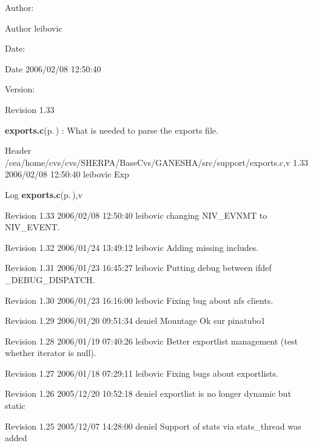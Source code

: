 \begin{Desc}
\item[Author:]\begin{Desc}
\item[Author]leibovic \end{Desc}
\end{Desc}
\begin{Desc}
\item[Date:]\begin{Desc}
\item[Date]2006/02/08 12:50:40 \end{Desc}
\end{Desc}
\begin{Desc}
\item[Version:]\begin{Desc}
\item[Revision]1.33 \end{Desc}
\end{Desc}
{\bf exports.c}{\rm (p.\,\pageref{exports_8c})} : What is needed to parse the exports file.

\begin{Desc}
\item[Header]/cea/home/cvs/cvs/SHERPA/Base\-Cvs/GANESHA/src/support/exports.c,v 1.33 2006/02/08 12:50:40 leibovic Exp \end{Desc}


\begin{Desc}
\item[Log]{\bf exports.c}{\rm (p.\,\pageref{exports_8c})},v \end{Desc}
Revision 1.33 2006/02/08 12:50:40 leibovic changing NIV\_\-EVNMT to NIV\_\-EVENT.

Revision 1.32 2006/01/24 13:49:12 leibovic Adding missing includes.

Revision 1.31 2006/01/23 16:45:27 leibovic Putting debug between ifdef \_\-DEBUG\_\-DISPATCH.

Revision 1.30 2006/01/23 16:16:00 leibovic Fixing bug about nfs clients.

Revision 1.29 2006/01/20 09:51:34 deniel Mountage Ok sur pinatubo1

Revision 1.28 2006/01/19 07:40:26 leibovic Better exportlist management (test whether iterator is null).

Revision 1.27 2006/01/18 07:29:11 leibovic Fixing bugs about exportlists.

Revision 1.26 2005/12/20 10:52:18 deniel exportlist is no longer dynamic but static

Revision 1.25 2005/12/07 14:28:00 deniel Support of stats via stats\_\-thread was added

